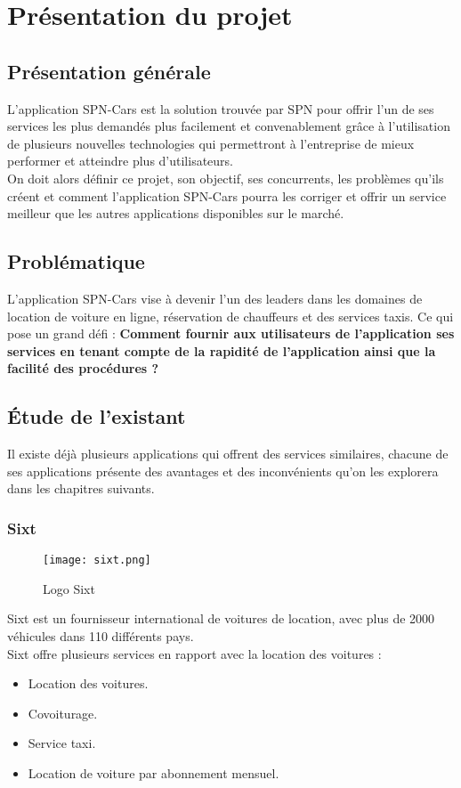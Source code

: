 \section{Présentation du projet}
\subsection{Présentation générale}
L'application SPN-Cars est la solution trouvée par SPN pour offrir l'un de ses services les plus demandés plus facilement et convenablement grâce à l'utilisation de plusieurs nouvelles technologies qui permettront à l'entreprise de mieux performer et atteindre plus d'utilisateurs.\\
\noindent On doit alors définir ce projet, son objectif, ses concurrents, les problèmes qu'ils créent et comment l'application SPN-Cars pourra les corriger et offrir un service meilleur que les autres applications disponibles sur le marché.
\subsection{Problématique}
L'application SPN-Cars vise à devenir l'un des leaders dans les domaines de location de voiture en ligne, réservation de chauffeurs et des services taxis. Ce qui pose un grand défi : \textbf{Comment fournir aux utilisateurs de l'application ses services en tenant compte de la rapidité de l'application ainsi que la facilité des procédures ?}
\subsection{Étude de l'existant}
Il existe déjà plusieurs applications qui offrent des services similaires, chacune de ses applications présente des avantages et des inconvénients qu'on les explorera dans les chapitres suivants.
\subsubsection{Sixt}
\vspace{1cm}
\begin{figure}[H]
    \centering
    \texttt{[image: sixt.png]}
    \vspace{0.5cm}
    \caption{Logo Sixt}
    \label{fig:sixt_logo}
\end{figure}
\vspace{1cm}
Sixt \cite{sixt} est un fournisseur international de voitures de location, avec plus de 2000 véhicules dans 110 différents pays.\\
\noindent Sixt offre plusieurs services en rapport avec la location des voitures :
\begin{itemize}
    \item Location des voitures.
    \item Covoiturage.
    \item Service taxi.
    \item Location de voiture par abonnement mensuel.
\end{itemize}
